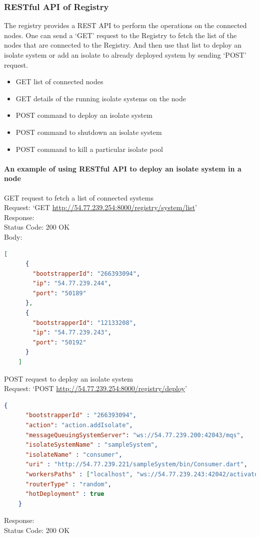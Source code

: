   \subsubsection{RESTful API of Registry}
  \label{subsec:restApi}
  The registry provides a REST API to perform the operations on the connected nodes. One can send a ‘GET’ request to the Registry to fetch the list of the nodes that are connected to the Registry. And then use that list to deploy an isolate system or add an isolate to already deployed system by sending ‘POST’ request.
  \begin{itemize}
  \item GET list of connected nodes
  \item GET details of the running isolate systems on the node
  \item POST command to deploy an isolate system
  \item POST command to shutdown an isolate system
  \item POST command to kill a particular isolate pool
  \end{itemize}

\paragraph{An example of using RESTful API to deploy an isolate system in a node}

\begin{description}
  \item{GET request to fetch a list of connected systems}\\
  Request: ‘GET \url{http://54.77.239.254:8000/registry/system/list}’\\
  Response: \\
  Status Code: 200 OK\\
  Body:
  \begin{lstlisting}[language=json,firstnumber=1]
    [
      {
        "bootstrapperId": "266393094",
        "ip": "54.77.239.244",
        "port": "50189"
      },
      {
        "bootstrapperId": "12133208",
        "ip": "54.77.239.243",
        "port": "50192"
      }
    ]
  \end{lstlisting}

  \item{POST request to deploy an isolate system}\\
  Request: ‘POST \url{http://54.77.239.254:8000/registry/deploy}’
  \begin{lstlisting}[language=json,firstnumber=1]
    {
      "bootstrapperId" : "266393094",
      "action": "action.addIsolate",
      "messageQueuingSystemServer": "ws://54.77.239.200:42043/mqs",
      "isolateSystemName" : "sampleSystem",
      "isolateName" : "consumer",
      "uri" : "http://54.77.239.221/sampleSystem/bin/Consumer.dart",
      "workersPaths" : ["localhost", "ws://54.77.239.243:42042/activator"],
      "routerType" : "random",
      "hotDeployment" : true
    }
  \end{lstlisting}
  Response: \\
  Status Code: 200 OK\\
\end{description}

